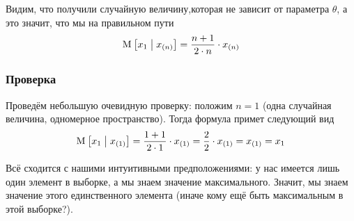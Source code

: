 Видим, что получили случайную величину,которая не зависит от параметра
$\theta$, а это значит, что мы на правильном пути
$$\operatorname{M}_{} \left[ x_1 \;\middle|\; x_{\left( n \right)} \right]
  = \frac{n+1}{2 \cdot n} \cdot x_{\left( n \right)}$$

\subsubsection{Проверка}
Проведём небольшую очевидную проверку: положим $n=1$ (одна случайная величина,
одномерное пространство). Тогда формула примет следующий вид
$$\operatorname{M}_{} \left[ x_1 \;\middle|\; x_{\left( 1 \right)} \right]
  = \frac{1+1}{2 \cdot 1} \cdot x_{\left( 1 \right)}
  = \frac{2}{2} \cdot x_{\left( 1 \right)}
  = x_{\left( 1 \right)} = x_1$$

Всё сходится с нашими интуитивными предположениями: у нас имеется лишь один
элемент в выборке, а мы знаем значение максимального. Значит, мы знаем
значение этого единственного элемента (иначе кому ещё быть максимальным
в этой выборке?).
